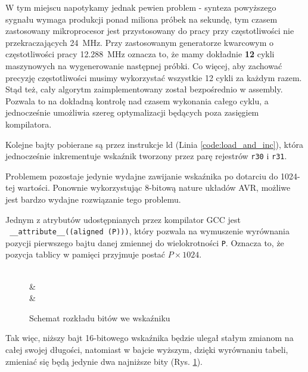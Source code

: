 \documentclass[12pt, a4paper]{article}
\begin{document}
W tym miejscu napotykamy jednak pewien problem - synteza powyższego sygnału wymaga produkcji ponad miliona próbek na sekundę,
tym czasem zastosowany mikroprocesor jest przystosowany do pracy przy częstotliwości nie przekraczających \qty{24}{\MHz}.
Przy zastosowanym generatorze kwarcowym o częstotliwości pracy \qty{12,288}{\MHz} oznacza to, że mamy dokładnie \textbf{12} cykli maszynowych
na wygenerowanie następnej próbki. Co więcej, aby zachować precyzję częstotliwości musimy wykorzystać wszystkie 12 cykli za każdym razem.
Stąd też, cały algorytm zaimplementowany został bezpośrednio w assembly.
Pozwala to na dokładną kontrolę nad czasem wykonania całego cyklu, a jednocześnie umożliwia szereg optymalizacji
będących poza zasięgiem kompilatora.

Kolejne bajty pobierane są przez instrukcje ld (Linia \ref{code:load_and_inc}), która jednocześnie
inkrementuje wskaźnik tworzony przez parę rejestrów \verb|r30| i \verb|r31|.

Problemem pozostaje jedynie wydajne zawijanie wskaźnika po dotarciu do 1024-tej wartości.
Ponownie wykorzystując 8-bitową nature układów AVR, możliwe jest bardzo wydajne rozwiązanie tego problemu.

Jednym z atrybutów udostępnianych przez kompilator GCC jest\\
\verb| __attribute__((aligned (P)))|, który pozwala na wymuszenie
wyrównania pozycji pierwszego bajtu danej zmiennej do wielokrotności \verb|P|.
Oznacza to, że pozycja tablicy w pamięci przyjmuje postać $P \times 1024$.

\begin{figure}[h]
	\centering
	\hfill

	\begin{bytefield}[bitwidth=7mm,endianness=big]{16}
		 \\
		 & \\
		 & \\
	\end{bytefield}
	\caption{Schemat rozkładu bitów we wskaźniku}
	\label{fig:bits_ex}
\end{figure}


Tak więc, niższy bajt 16-bitowego wskaźnika będzie ulegał stałym zmianom na całej swojej długości,
natomiast w bajcie wyższym, dzięki wyrównaniu tabeli, zmieniać się będą jedynie dwa najniższe bity (Rys. \ref{fig:bits_ex}).
\end{document}
